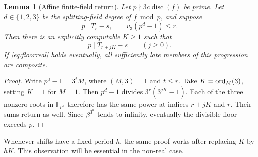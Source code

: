 \documentclass[11pt,a4paper]{article}
\newtheorem{lemma}[theorem]{Lemma}
\theoremstyle{definition}\newtheorem{definition}[theorem]{Definition}
\theoremstyle{remark}\newtheorem{remark}[theorem]{Remark}
\begin{document}
\begin{lemma}[Affine finite-field return]\label{lem:return}
Let $p\nmid3c\operatorname{disc}(f)$ be prime. Let $d\in\{1,2,3\}$ be the splitting-field degree of $f\bmod p$, and suppose
\[
 p\mid T_r-s,\qquad v_3(p^d-1)\le r.
\]
Then there is an explicitly computable $K\ge1$ such that
\[
 p\mid T_{r+jK}-s\qquad(j\ge0).
\]
If \eqref{eq:floorreal} holds eventually, all sufficiently late members of this progression are composite.
\end{lemma}
\begin{proof}
Write $p^d-1=3^tM$, where $(M,3)=1$ and $t\le r$. Take $K=\operatorname{ord}_M(3)$, setting $K=1$ for $M=1$. Then $p^d-1$ divides $3^r(3^{jK}-1)$. Each of the three nonzero roots in $\mathbb F_{p^d}$ therefore has the same power at indices $r+jK$ and $r$. Their sums return as well. Since $\beta^{3^n}$ tends to infinity, eventually the divisible floor exceeds $p$.
\end{proof}
Whenever shifts have a fixed period $h$, the same proof works after replacing $K$ by $hK$. This observation will be essential in the non-real case.
\end{document}
